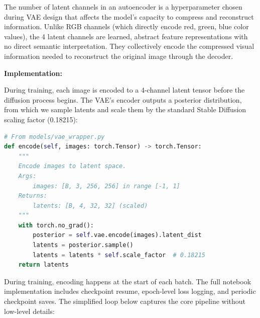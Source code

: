The number of latent channels in an autoencoder is a hyperparameter chosen during VAE design that affects the model's capacity to compress and reconstruct information. Unlike RGB channels (which directly encode red, green, blue color values), the 4 latent channels are learned, abstract feature representations with no direct semantic interpretation. They collectively encode the compressed visual information needed to reconstruct the original image through the decoder.

\textbf{Implementation:}

During training, each image is encoded to a 4-channel latent tensor before the diffusion process begins. The VAE's encoder outputs a posterior distribution, from which we sample latents and scale them by the standard Stable Diffusion scaling factor (0.18215):

\begin{lstlisting}[language=Python, caption={VAE encoder (\texttt{models/vae\_wrapper.py})}]
# From models/vae_wrapper.py
def encode(self, images: torch.Tensor) -> torch.Tensor:
    """
    Encode images to latent space.
    Args:
        images: [B, 3, 256, 256] in range [-1, 1]
    Returns:
        latents: [B, 4, 32, 32] (scaled)
    """
    with torch.no_grad():
        posterior = self.vae.encode(images).latent_dist
        latents = posterior.sample()
        latents = latents * self.scale_factor  # 0.18215
    return latents
\end{lstlisting}

During training, encoding happens at the start of each batch. The full notebook implementation includes checkpoint resume, epoch-level loss logging, and periodic checkpoint saves. The simplified loop below captures the core pipeline without low-level details:

